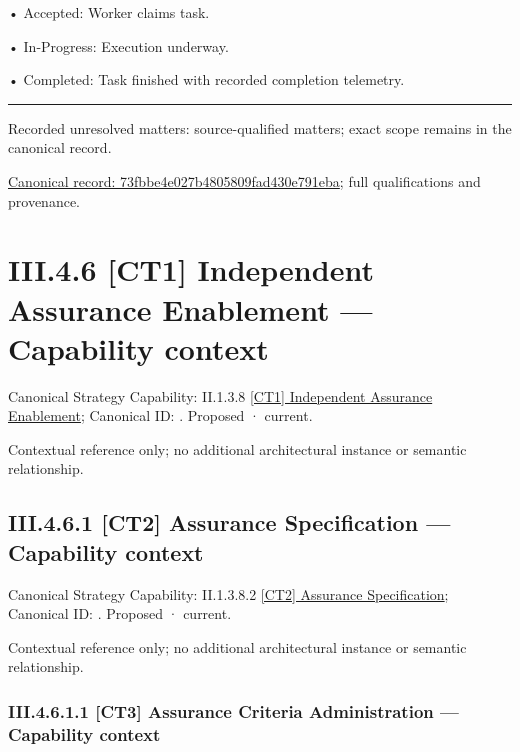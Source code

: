 •
Accepted: Worker claims task.



•
In-Progress: Execution underway.



•
Completed: Task finished with recorded completion telemetry.



\medskip\hrule\medskip

{\small Recorded unresolved matters: source-qualified matters; exact scope remains in the canonical record.}\par
{\footnotesize \href{../../../../../../../continuum/business/business-process/73fbbe4e027b4805809fad430e791eba.md}{Canonical record: 73fbbe4e027b4805809fad430e791eba}; full qualifications and provenance.}\par
\section*{III.4.6 [CT1] Independent Assurance Enablement — Capability context}
\label{navigation:III.4.6}

{\small Canonical Strategy Capability: II.1.3.8 \hyperref[element:616682b612d244429e656b040e002d56]{[CT1] Independent Assurance Enablement}; Canonical ID: \texttt{}. Proposed · current.}\par
Contextual reference only; no additional architectural instance or semantic relationship.\par
\subsection*{III.4.6.1 [CT2] Assurance Specification — Capability context}
\label{navigation:III.4.6.1}

{\small Canonical Strategy Capability: II.1.3.8.2 \hyperref[element:b81775d89d774cf8ba61731d13c67a54]{[CT2] Assurance Specification}; Canonical ID: \texttt{}. Proposed · current.}\par
Contextual reference only; no additional architectural instance or semantic relationship.\par
\subsubsection*{III.4.6.1.1 [CT3] Assurance Criteria Administration — Capability context}
\label{navigation:III.4.6.1.1}

